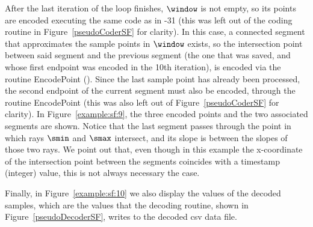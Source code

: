 \vspace{-10pt}
After the last iteration of the loop finishes, $\window$ is not empty, so its points are encoded executing the same code as in -31 (this was left out of the coding routine in Figure~\ref{pseudoCoderSF} for clarity). In this case, a connected segment that approximates the sample points in $\window$ exists, so the intersection point between said segment and the previous segment (the one that was saved, and whose first endpoint was encoded in the 10th iteration), is encoded via the routine EncodePoint (). Since the last sample point has already been processed, the second endpoint of the current segment must also be encoded, through the routine EncodePoint (this was also left out of Figure~\ref{pseudoCoderSF} for clarity). In Figure~\ref{example:sf:9}, the three encoded points and the two associated segments are shown. Notice that the last segment passes through the point in which rays $\smin$ and $\smax$ intersect, and its slope is between the slopes of those two rays. We point out that, even though in this example the x-coordinate of the intersection point between the segments coincides with a timestamp (integer) value, this is not always necessary the case.




\clearpage


Finally, in Figure~\ref{example:sf:10} we also display the values of the decoded samples, which are the values that the decoding routine, shown in Figure~\ref{pseudoDecoderSF}, writes to the decoded csv data file.


